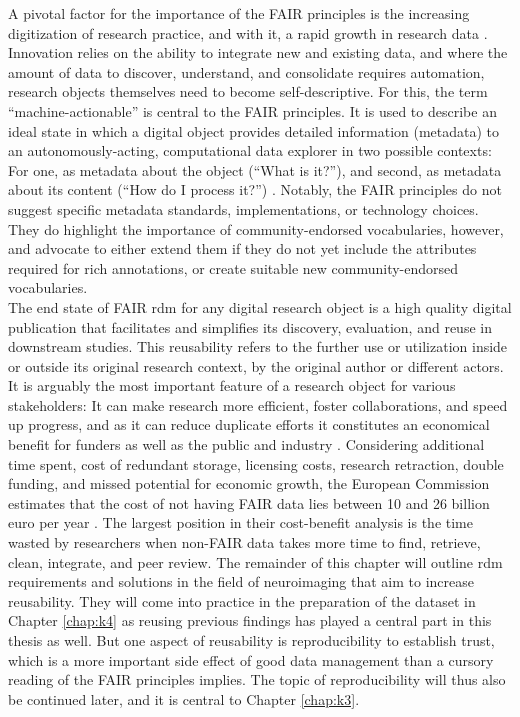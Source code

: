 A pivotal factor for the importance of the FAIR principles is the increasing digitization of research practice, and with it, a rapid growth in research data \citep{dfg}.
Innovation relies on the ability to integrate new and existing data, and where the amount of data to discover, understand, and consolidate requires automation, research objects themselves need to become self-descriptive.
For this, the term ``machine-actionable'' is central to the \gls{FAIR} principles.
It is used to describe an ideal state in which a digital object provides detailed information (metadata) to an autonomously-acting, computational data explorer in two possible contexts: For one, as metadata about the object (``What is it?''), and second, as metadata about its content (``How do I process it?'') \citep{wilkinson2016fair}.
Notably, the \gls{FAIR} principles do not suggest specific metadata standards, implementations, or technology choices.
They do highlight the importance of community-endorsed vocabularies, however, and advocate to either extend them if they do not yet include the attributes required for rich annotations, or create suitable new community-endorsed vocabularies. \\
The end state of FAIR \gls{rdm} for any digital research object is a high quality digital publication that facilitates and simplifies its discovery, evaluation, and reuse in downstream studies.
This reusability refers to the further use or utilization inside or outside its original research context, by the original author or different actors.
It is arguably the most important feature of a research object for various stakeholders: It can make research more efficient, foster collaborations, and speed up progress, and as it can reduce duplicate efforts it constitutes an economical benefit for funders as well as the public and industry \citep{nfdi2022data}.
Considering additional time spent, cost of redundant storage, licensing costs, research retraction, double funding, and missed potential for economic growth, the European Commission estimates that the cost of not having FAIR data lies between 10 and 26 billion euro per year \citep{eu2019FAIR}.
The largest position in their cost-benefit analysis is the time wasted by researchers when non-FAIR data takes more time to find, retrieve, clean, integrate, and peer review.
The remainder of this chapter will outline \gls{rdm} requirements and solutions in the field of neuroimaging that aim to increase reusability.
They will come into practice in the preparation of the dataset in Chapter \ref{chap:k4} as reusing previous findings has played a central part in this thesis as well.
But one aspect of reusability is reproducibility to establish trust, which is a more important side effect of good data management than a cursory reading of the \gls{FAIR} principles implies.
The topic of reproducibility will thus also be continued later, and it is central to Chapter \ref{chap:k3}.

